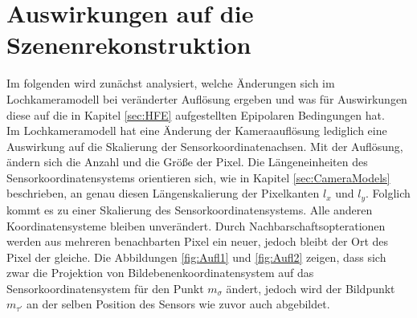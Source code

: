 
\section{Auswirkungen auf die Szenenrekonstruktion}

Im folgenden wird zunächst analysiert, welche Änderungen sich im Lochkameramodell bei veränderter Auflösung ergeben und was für Auswirkungen diese auf die in Kapitel \ref{sec:HFE} aufgestellten Epipolaren Bedingungen hat.\\

Im Lochkameramodell hat eine Änderung der Kameraauflösung lediglich eine Auswirkung auf die Skalierung der Sensorkoordinatenachsen. Mit der Auflösung, ändern sich die Anzahl und die Größe der Pixel. Die Längeneinheiten des Sensorkoordinatensystems orientieren sich, wie in Kapitel \ref{sec:CameraModels} beschrieben, an genau diesen Längenskalierung der Pixelkanten $l_x$ und $l_y$. Folglich kommt es zu einer Skalierung des Sensorkoordinatensystems. Alle anderen Koordinatensysteme bleiben unverändert. Durch Nachbarschaftsopterationen werden aus mehreren benachbarten Pixel ein neuer, jedoch bleibt der Ort des Pixel der gleiche\cite{Doessel}. Die Abbildungen \ref{fig:Aufl1} und \ref{fig:Aufl2} zeigen, dass sich zwar die Projektion von Bildebenenkoordinatensystem auf das Sensorkoordinatensystem für den Punkt $m_\sigma$ ändert, jedoch wird der Bildpunkt $m_{\tau'}$ an der selben Position des Sensors wie zuvor auch abgebildet.\\



 




